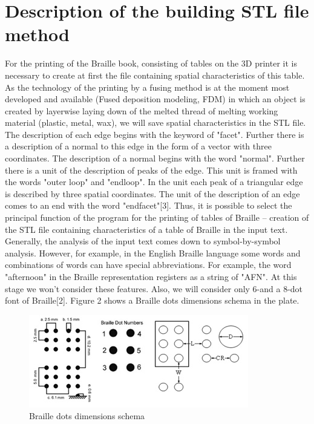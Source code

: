 \documentclass[journal,article,submit,moreauthors,pdftex,10pt,a4paper]{mdpi}
\begin{document}
\section{Description of the building STL file method}

For the printing of the Braille book, consisting of tables on the 3D printer it is necessary to create at first the file containing spatial characteristics of this table. As the technology of the printing by a fusing method is at the moment most developed and available (Fused deposition modeling, FDM) in which an object is created by layerwise laying down of the melted thread of melting working material (plastic, metal, wax), we will save spatial characteristics in the STL file. The description of each edge begins with the keyword of "facet". Further there is a description of a normal to this edge in the form of a vector with three coordinates. The description of a normal begins with the word "normal". Further there is a unit of the description of peaks of the edge. This unit is framed with the words "outer loop" and "endloop". In the unit each peak of a triangular edge is described by three spatial coordinates. The unit of the description of an edge comes to an end with the word "endfacet"[3].
Thus, it is possible to select the principal function of the program for the printing of tables of Braille – creation of the STL file containing characteristics of a table of Braille in the input text. Generally, the analysis of the input text comes down to symbol-by-symbol analysis. However, for example, in the English Braille language some words and combinations of words can have special abbreviations. For example, the word "afternoon" in the Braille representation registers as a string of "AFN". At this stage we won't consider these features. Also, we will consider only 6-and a 8-dot font of Braille[2]. Figure 2 shows a Braille dots dimensions schema in the plate.

\begin{figure}[H]
\centering
\includegraphics[width=10 cm]{Braille-Dots-Schema.jpg}
\caption{Braille dots dimensions schema}
\end{figure} 
\end{document}

